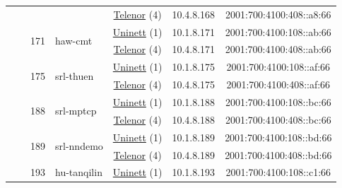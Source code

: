 \begin{small}
\begin{center}
\begin{longtable}{|c|c|c|c|c|c|c|c|}
  &  &  &  & \multicolumn{2}{|c|}{\tiny{\href{https://www.telenor.no}{Telenor} (4)}} & \tiny{10.4.8.168} & \tiny{2001:700:4100:408::a8:66} \\* \cline{3-3}\cline{4-4}\cline{5-5}\cline{6-6}\cline{7-7}\cline{8-8}
  &  & \multirow{2}{*}{\tiny{171}} & \multicolumn{1}{|l|}{\multirow{2}{*}{\tiny{haw-cmt}}} & \multicolumn{2}{|c|}{\tiny{\href{https://www.uninett.no}{Uninett} (1)}} & \tiny{10.1.8.171} & \tiny{2001:700:4100:108::ab:66} \\* \cline{5-5}\cline{6-6}\cline{7-7}\cline{8-8}
  &  &  &  & \multicolumn{2}{|c|}{\tiny{\href{https://www.telenor.no}{Telenor} (4)}} & \tiny{10.4.8.171} & \tiny{2001:700:4100:408::ab:66} \\* \cline{3-3}\cline{4-4}\cline{5-5}\cline{6-6}\cline{7-7}\cline{8-8}
  &  & \multirow{2}{*}{\tiny{175}} & \multicolumn{1}{|l|}{\multirow{2}{*}{\tiny{srl-thuen}}} & \multicolumn{2}{|c|}{\tiny{\href{https://www.uninett.no}{Uninett} (1)}} & \tiny{10.1.8.175} & \tiny{2001:700:4100:108::af:66} \\* \cline{5-5}\cline{6-6}\cline{7-7}\cline{8-8}
  &  &  &  & \multicolumn{2}{|c|}{\tiny{\href{https://www.telenor.no}{Telenor} (4)}} & \tiny{10.4.8.175} & \tiny{2001:700:4100:408::af:66} \\* \cline{3-3}\cline{4-4}\cline{5-5}\cline{6-6}\cline{7-7}\cline{8-8}
  &  & \multirow{2}{*}{\tiny{188}} & \multicolumn{1}{|l|}{\multirow{2}{*}{\tiny{srl-mptcp}}} & \multicolumn{2}{|c|}{\tiny{\href{https://www.uninett.no}{Uninett} (1)}} & \tiny{10.1.8.188} & \tiny{2001:700:4100:108::bc:66} \\* \cline{5-5}\cline{6-6}\cline{7-7}\cline{8-8}
  &  &  &  & \multicolumn{2}{|c|}{\tiny{\href{https://www.telenor.no}{Telenor} (4)}} & \tiny{10.4.8.188} & \tiny{2001:700:4100:408::bc:66} \\* \cline{3-3}\cline{4-4}\cline{5-5}\cline{6-6}\cline{7-7}\cline{8-8}
  &  & \multirow{2}{*}{\tiny{189}} & \multicolumn{1}{|l|}{\multirow{2}{*}{\tiny{srl-nndemo}}} & \multicolumn{2}{|c|}{\tiny{\href{https://www.uninett.no}{Uninett} (1)}} & \tiny{10.1.8.189} & \tiny{2001:700:4100:108::bd:66} \\* \cline{5-5}\cline{6-6}\cline{7-7}\cline{8-8}
  &  &  &  & \multicolumn{2}{|c|}{\tiny{\href{https://www.telenor.no}{Telenor} (4)}} & \tiny{10.4.8.189} & \tiny{2001:700:4100:408::bd:66} \\* \cline{3-3}\cline{4-4}\cline{5-5}\cline{6-6}\cline{7-7}\cline{8-8}
  &  & \multirow{2}{*}{\tiny{193}} & \multicolumn{1}{|l|}{\multirow{2}{*}{\tiny{hu-tanqilin}}} & \multicolumn{2}{|c|}{\tiny{\href{https://www.uninett.no}{Uninett} (1)}} & \tiny{10.1.8.193} & \tiny{2001:700:4100:108::c1:66} \\* \cline{5-5}\cline{6-6}\cline{7-7}\cline{8-8}

\end{longtable}
\end{center}
\end{small}
